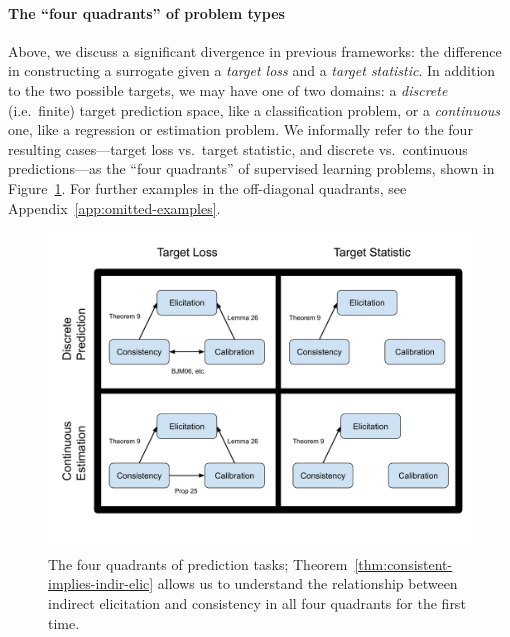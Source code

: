 \documentclass[anon,12pt]{colt2021} %
\begin{document}
\paragraph{The ``four quadrants'' of problem types}
Above, we discuss a significant divergence in previous frameworks: the difference in constructing a surrogate given a \emph{target loss} and a \emph{target statistic}.
In addition to the two possible targets, we may have one of two domains: a \emph{discrete} (i.e.\ finite) target prediction space, like a classification problem, or a \emph{continuous} one, like a regression or estimation problem.
We informally refer to the four resulting cases---target loss vs.\ target statistic, and discrete vs.\ continuous predictions---as the ``four quadrants'' of supervised learning problems, shown in Figure~\ref{fig:four-quadrants}.
For further examples in the off-diagonal quadrants, see Appendix~\ref{app:omitted-examples}.

\begin{figure}
	\begin{minipage}{0.25\linewidth}
	\caption{The four quadrants of prediction tasks; Theorem~\ref{thm:consistent-implies-indir-elic} allows us to understand the relationship between indirect elicitation and consistency in all four quadrants for the first time.}\label{fig:four-quadrants}	
	\end{minipage}
	\hfill
	\begin{minipage}{0.72\linewidth}
	\centering
	\includegraphics[width=0.95\linewidth]{tikz/consistency-elicitation-calibration.pdf}
	\end{minipage}
\end{figure}
\end{document}
